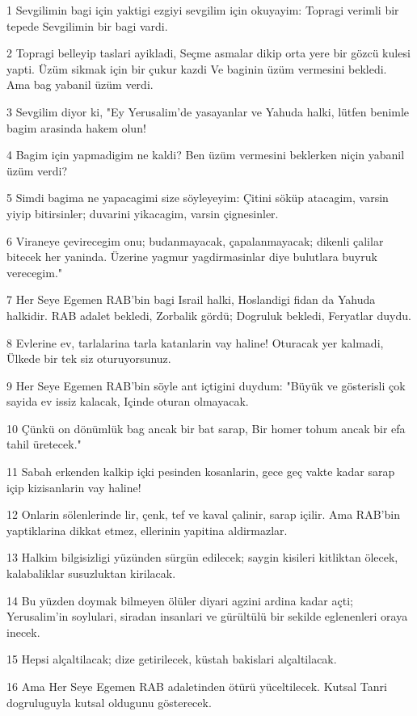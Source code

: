 \par 1 Sevgilimin bagi için yaktigi ezgiyi sevgilim için okuyayim: Topragi verimli bir tepede Sevgilimin bir bagi vardi.
\par 2 Topragi belleyip taslari ayikladi, Seçme asmalar dikip orta yere bir gözcü kulesi yapti. Üzüm sikmak için bir çukur kazdi Ve baginin üzüm vermesini bekledi. Ama bag yabanil üzüm verdi.
\par 3 Sevgilim diyor ki, "Ey Yerusalim'de yasayanlar ve Yahuda halki, lütfen benimle bagim arasinda hakem olun!
\par 4 Bagim için yapmadigim ne kaldi? Ben üzüm vermesini beklerken niçin yabanil üzüm verdi?
\par 5 Simdi bagima ne yapacagimi size söyleyeyim: Çitini söküp atacagim, varsin yiyip bitirsinler; duvarini yikacagim, varsin çignesinler.
\par 6 Viraneye çevirecegim onu; budanmayacak, çapalanmayacak; dikenli çalilar bitecek her yaninda. Üzerine yagmur yagdirmasinlar diye bulutlara buyruk verecegim."
\par 7 Her Seye Egemen RAB'bin bagi Israil halki, Hoslandigi fidan da Yahuda halkidir. RAB adalet bekledi, Zorbalik gördü; Dogruluk bekledi, Feryatlar duydu.
\par 8 Evlerine ev, tarlalarina tarla katanlarin vay haline! Oturacak yer kalmadi, Ülkede bir tek siz oturuyorsunuz.
\par 9 Her Seye Egemen RAB'bin söyle ant içtigini duydum: "Büyük ve gösterisli çok sayida ev issiz kalacak, Içinde oturan olmayacak.
\par 10 Çünkü on dönümlük bag ancak bir bat sarap, Bir homer tohum ancak bir efa tahil üretecek."
\par 11 Sabah erkenden kalkip içki pesinden kosanlarin, gece geç vakte kadar sarap içip kizisanlarin vay haline!
\par 12 Onlarin sölenlerinde lir, çenk, tef ve kaval çalinir, sarap içilir. Ama RAB'bin yaptiklarina dikkat etmez, ellerinin yapitina aldirmazlar.
\par 13 Halkim bilgisizligi yüzünden sürgün edilecek; saygin kisileri kitliktan ölecek, kalabaliklar susuzluktan kirilacak.
\par 14 Bu yüzden doymak bilmeyen ölüler diyari agzini ardina kadar açti; Yerusalim'in soylulari, siradan insanlari ve gürültülü bir sekilde eglenenleri oraya inecek.
\par 15 Hepsi alçaltilacak; dize getirilecek, küstah bakislari alçaltilacak.
\par 16 Ama Her Seye Egemen RAB adaletinden ötürü yüceltilecek. Kutsal Tanri dogruluguyla kutsal oldugunu gösterecek.
